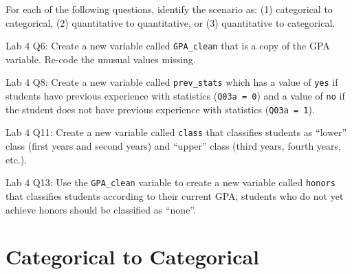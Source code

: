 \begin{frame}
\fto
\begin{clicker}{For each of the following questions, identify the scenario as: (1) categorical to categorical, (2) quantitative to quantitative, or (3) quantitative to categorical.}
\begin{itemize}
\footnotesize{
\item[\underline{\hspace{0.2in}}] Lab 4 Q6: Create a new variable called \texttt{GPA\_clean} that is a copy of the GPA variable.  Re-code the unusual values missing.
\item[\underline{\hspace{0.2in}}] Lab 4 Q8: Create a new variable called \texttt{prev\_stats} which has a value of \texttt{yes} if students have previous experience with statistics (\texttt{Q03a = 0}) and a value of \texttt{no} if the student does not have previous experience with statistics (\texttt{Q03a = 1}).
\item[\underline{\hspace{0.2in}}] Lab 4 Q11: Create a new variable called \texttt{class} that classifies students as ``lower'' class (first years and second years) and ``upper'' class (third years, fourth years, etc.).
\item[\underline{\hspace{0.2in}}] Lab 4 Q13: Use the \texttt{GPA\_clean} variable to create a new variable called \texttt{honors} that classifies students according to their current GPA; students who do not yet achieve honors should be classified as ``none''.}
\end{itemize}
\end{clicker}
\end{frame}

\section[Categorical to Categorical]{Categorical to Categorical}
\subsection{}
\begin{frame}
\end{frame}

